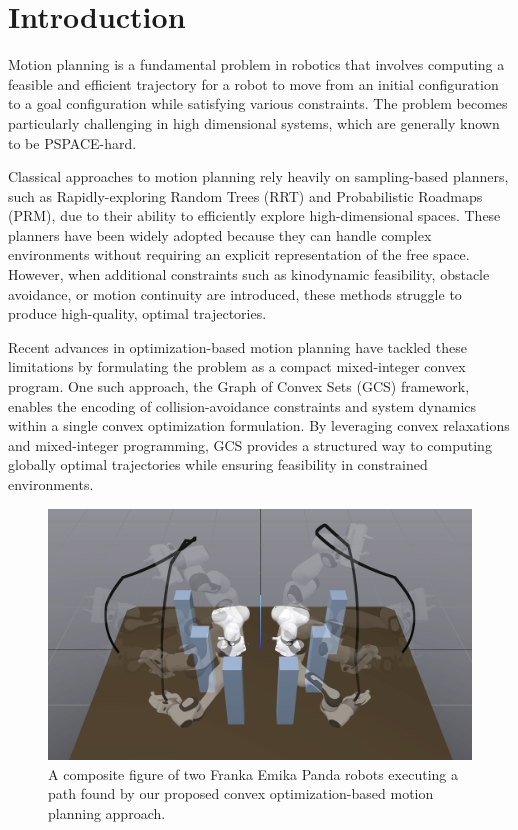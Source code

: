 \section{Introduction}

Motion planning is a fundamental problem in robotics that involves computing a feasible and efficient trajectory for a robot to move from an initial configuration to a goal configuration while satisfying various constraints\cite{lavalle2006planning}.
%
The problem becomes particularly challenging in high dimensional systems, which are generally known to be PSPACE-hard\cite{reif1979complexity}.

Classical approaches to motion planning rely heavily on sampling-based planners, such as Rapidly-exploring Random Trees (RRT)\cite{lavalle2001randomized} and Probabilistic Roadmaps (PRM)\cite{kavraki1996probabilistic}, due to their ability to efficiently explore high-dimensional spaces.
%
These planners have been widely adopted because they can handle complex environments without requiring an explicit representation of the free space.
%
However, when additional constraints such as kinodynamic feasibility, obstacle avoidance, or motion continuity are introduced, these methods struggle to produce high-quality, optimal trajectories.

Recent advances in optimization-based motion planning have tackled these limitations by formulating the problem as a compact mixed-integer convex program\cite{marcucci2023motion}.
%
One such approach, the Graph of Convex Sets (GCS) framework\cite{marcucci2024shortest}, enables the encoding of collision-avoidance constraints and system dynamics within a single convex optimization formulation.
%
By leveraging convex relaxations and mixed-integer programming, GCS provides a structured way to computing globally optimal trajectories while ensuring feasibility in constrained environments.

\begin{figure}[!t]
    \centering
    \includegraphics[width=0.99\linewidth]{figures/gcs_solution_trajectory_hd.jpg}
    \caption{A composite figure of two Franka Emika Panda robots executing a path found by our proposed convex optimization-based motion planning approach.}
    \label{fig:gcs_solution}
\end{figure}

